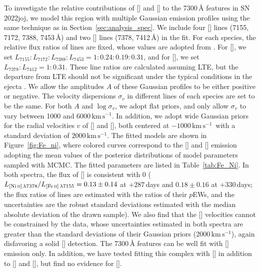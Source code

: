 \documentclass[twocolumn]{aastex631}
\newcommand{\sn}{SN\,2022joj}
\newcommand{\kms}{$\mathrm{km}\,\mathrm{s}^{-1}$}
\begin{document}
\begin{CJK*}{UTF8}{gbsn}
To investigate the relative contributions of [] and [] to the 7300\,\r{A} features in \sn, we model this region with multiple Gaussian emission profiles using the same technique as in Section~\ref{sec:analysis_spec}. We include four [] lines (7155, 7172, 7388, 7453\,\r{A}) and two [] lines (7378, 7412\,\r{A}) in the fit. For each species, the relative flux ratios of lines are fixed, whose values are adopted from \citet{Jerkstrand_2015}. For [], we set $L_{7155}:L_{7172}:L_{7388}:L_{7453} = 1:0.24:0.19:0.31$, and for [], we set $L_{7378}:L_{7412} = 1:0.31$. These line ratios are calculated assuming LTE, but the departure from LTE should not be significant under the typical conditions in the ejecta \citep{Jerkstrand_2015}. We allow the amplitudes $A$ of these Gaussian profiles to be either positive or negative. The velocity dispersions $\sigma_v$ in different lines of each species are set to be the same. For both $A$ and $\log\sigma_v$, we adopt flat priors, and only allow $\sigma_v$ to vary between 1000 and 6000\,\kms. In addition, we adopt wide Gaussian priors for the radial velocities $v$ of [] and [], both centered at $-1000$\,\kms\ with a standard deviation of $2000$\,\kms. The fitted models are shown in Figure~\ref{fig:Fe_ni}, where colored curves correspond to the [] and [] emission adopting the mean values of the posterior distributions of model parameters sampled with MCMC. The fitted parameters are listed in Table~\ref{tab:Fe_Ni}. In both spectra, the flux of [] is consistent with 0 (${L_{[\mathrm{Ni}\,\textsc{ii}]\,\lambda7378}}/{L_{[\mathrm{Fe}\,\textsc{ii}]\,\lambda7155}}=0.13\pm0.14$ at $+287$\,days and $0.18\pm0.16$ at $+330$\,days; the flux ratios of lines are estimated with the ratios of their $p$EWs, and the uncertainties are the robust standard deviations estimated with the median absolute deviation of the drawn sample). We also find that the [] velocities cannot be constrained by the data, whose uncertainties estimated in both spectra are greater than the standard deviations of their Gaussian priors (2000\,\kms), again disfavoring a solid [] detection. The 7300\,\r{A} features can be well fit with [] emission only. In addition, we have tested fitting this complex with [] in addition to [] and [], but find no evidence for [].


\end{CJK*}
\end{document}
